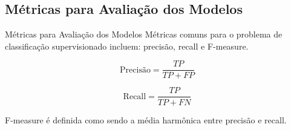 \subsection{Métricas para Avaliação dos Modelos}
\begin{frame}{Métricas para Avaliação dos Modelos}
    Métricas comuns para o problema de classificação supervisionado incluem:
    precisão, recall e F-measure. 


    \begin{equation}
        \text{Precisão} = \frac{TP}{TP + FP} 
    \end{equation}

    \vspace{0.2cm}

    \begin{equation}
        \text{Recall} = \frac{TP}{TP + FN}
    \end{equation}

    \vspace{0.2cm}

    F-measure é definida como sendo a média harmônica entre precisão e recall. 
\end{frame}

